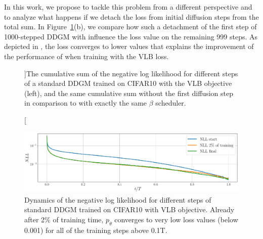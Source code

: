 In this work, we propose to tackle this problem from a different perspective and to analyze what happens if we detach the loss from initial diffusion steps from the total sum. In Figure~\ref{fig:nnl_cumsum_fullfig}(b), we compare how such a detachment of the first step of 1000-stepped DDGM with \ours{} influence the loss value on the remaining 999 steps. As depicted in \ours{}, the loss converges to lower values that explains the improvement of the performance of \ours{} when training with the VLB loss.

\begin{figure}[h]
	\centering
	\caption[][\baselineskip]{The cumulative sum of the negative log likelihood for different steps of a standard DDGM trained on CIFAR10 with the VLB objective (left), and the same cumulative sum without the first diffusion step in comparison to \ours{} with exactly the same $\beta$ scheduler.}
	\label{fig:nnl_cumsum_fullfig}
	\vspace*{2\baselineskip}
\end{figure}
\begin{figure}[h]
	\centering
    \includegraphics[width=\linewidth]{pics/4_daed/experiments/NLL_dynamics.pdf}
	\caption{Dynamics of the negative log likelihood for different steps of standard DDGM trained on CIFAR10 with VLB objective. Already after 2\% of training time, $p_\theta$ converges to very low loss values (below 0.001) for all of the training steps above 0.1T. }
	\label{fig:NLL_dynamics}
		\vspace*{2\baselineskip}
\end{figure}



